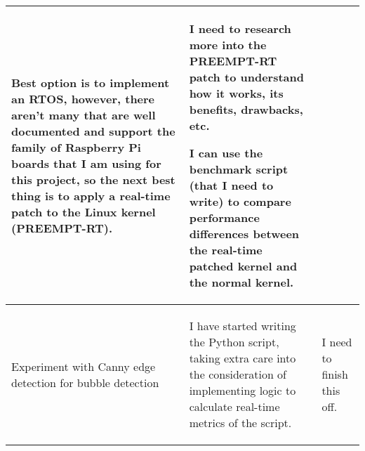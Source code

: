 \begin{table}[!h]
\begin{tabularx}{\textwidth}{|X|X|X|}
\begin{myitemize}
            \item Best option is to implement an RTOS, however, there aren't many that are well documented and support the family of Raspberry Pi boards that I am using for this project, so the next best thing is to apply a real-time patch to the Linux kernel (PREEMPT-RT).
        \end{myitemize} &
        \begin{myitemize}
            \item I need to research more into the PREEMPT-RT patch to understand how it works, its benefits, drawbacks, etc.
            \item I can use the benchmark script (that I need to write) to compare performance differences between the real-time patched kernel and the normal kernel.
        \end{myitemize} \\
        \hline
        Experiment with Canny edge detection for bubble detection & 
        \begin{myitemize}
            \item I have started writing the Python script, taking extra care into the consideration of implementing logic to calculate real-time metrics of the script.
        \end{myitemize} &
        \begin{myitemize}
            \item I need to finish this off.
        \end{myitemize} \\
    \end{tabularx}
\end{table}
